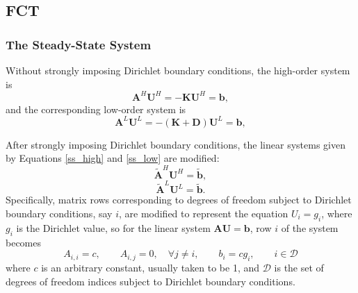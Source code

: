 \subsection{FCT}
\subsubsection{The Steady-State System}
Without strongly imposing Dirichlet boundary conditions, the high-order system is
\begin{equation}\label{ss_high}
   \mathbf{A}^H\mathbf{U}^H = -\mathbf{K}\mathbf{U}^H = \mathbf{b},
\end{equation}
and the corresponding low-order system is
\begin{equation}\label{ss_low}
   \mathbf{A}^L\mathbf{U}^L = -(\mathbf{K} + \mathbf{D})\mathbf{U}^L = \mathbf{b},
\end{equation}

After strongly imposing Dirichlet boundary conditions, the linear
systems given by Equations \ref{ss_high} and \ref{ss_low} are modified:
\begin{equation}\label{ss_highD}
   \tilde{\mathbf{A}}^H\mathbf{U}^H = \tilde{\mathbf{b}},
\end{equation}
\begin{equation}\label{ss_lowD}
   \tilde{\mathbf{A}}^L\mathbf{U}^L = \tilde{\mathbf{b}}.
\end{equation}
Specifically, matrix rows corresponding to degrees of freedom subject to Dirichlet
boundary conditions, say $i$, are modified to represent the equation
$U_i = g_i$, where $g_i$ is the Dirichlet value, so for the linear system
$\mathbf{A}\mathbf{U}=\mathbf{b}$, row $i$ of the system becomes
\[
   A_{i,i} = c, \qquad A_{i,j} = 0, \quad\forall j\ne i, \qquad b_i = c g_i,
      \qquad i\in \mathcal{D}
\]
where $c$ is an arbitrary constant, usually taken to be 1, and $\mathcal{D}$ is the set
of degrees of freedom indices subject to Dirichlet boundary conditions.

